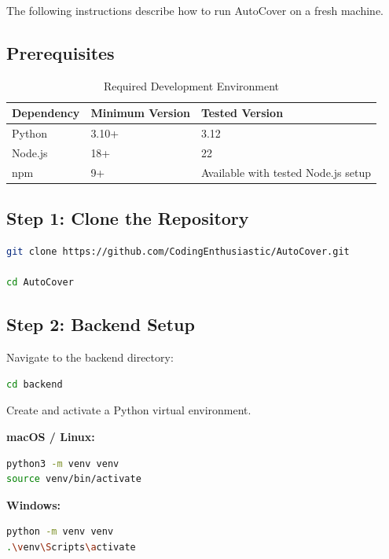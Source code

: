 \documentclass[11pt,a4paper]{article}
\begin{document}
The following instructions describe how to run AutoCover
on a fresh machine.

\subsection{Prerequisites}

\begin{table}[H]
\centering
\caption{Required Development Environment}
\begin{tabularx}{\textwidth}{L{4cm}L{4cm}Y}
\toprule
\textbf{Dependency} &
\textbf{Minimum Version} &
\textbf{Tested Version} \\
\midrule
Python & 3.10+ & 3.12 \\
Node.js & 18+ & 22 \\
npm & 9+ & Available with tested Node.js setup \\
\bottomrule
\end{tabularx}
\end{table}

\subsection{Step 1: Clone the Repository}

\begin{lstlisting}[language=bash]
git clone https://github.com/CodingEnthusiastic/AutoCover.git

cd AutoCover
\end{lstlisting}

\subsection{Step 2: Backend Setup}

Navigate to the backend directory:

\begin{lstlisting}[language=bash]
cd backend
\end{lstlisting}

Create and activate a Python virtual environment.

\textbf{macOS / Linux:}

\begin{lstlisting}[language=bash]
python3 -m venv venv
source venv/bin/activate
\end{lstlisting}

\textbf{Windows:}

\begin{lstlisting}[language=bash]
python -m venv venv
.\venv\Scripts\activate
\end{lstlisting}
\end{document}
